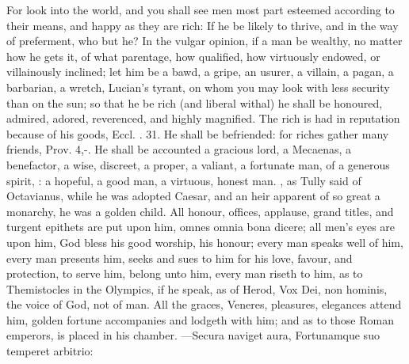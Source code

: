 {{For look into the world, and you shall see men most part esteemed
according to their means, and happy as they are rich:  If he be likely to thrive, and in
the way of preferment, who but he? In the vulgar opinion, if a man be
wealthy, no matter how he gets it, of what parentage, how qualified,
how virtuously endowed, or villainously inclined; let him be a bawd, a
gripe, an usurer, a villain, a pagan, a barbarian, a wretch,
Lucian's tyrant, on whom you may look with less security than on
the sun; so that he be rich (and liberal withal) he shall be honoured,
admired, adored, reverenced, and highly magnified. The rich is
had in reputation because of his goods, Eccl. . 31. He shall be
befriended: for riches gather many friends, Prov.  4,-. He
shall be accounted a gracious lord, a Mecaenas, a benefactor, a wise,
discreet, a proper, a valiant, a fortunate man, of a generous spirit,
: a hopeful, a good man, a
virtuous, honest man. , as Tully said of Octavianus, while he was adopted
Caesar, and an heir apparent of so great a monarchy, he was a
golden child. All honour, offices, applause, grand titles, and
turgent epithets are put upon him, omnes omnia bona dicere; all men's
eyes are upon him, God bless his good worship, his honour; every
man speaks well of him, every man presents him, seeks and sues to him
for his love, favour, and protection, to serve him, belong unto him,
every man riseth to him, as to Themistocles in the Olympics, if he
speak, as of Herod, Vox Dei, non hominis, the voice of God, not of man.
All the graces, Veneres, pleasures, elegances attend him,  golden
fortune accompanies and lodgeth with him; and as to those Roman
emperors, is placed in his chamber.
---Secura naviget aura,
Fortunamque suo temperet arbitrio:

}}
